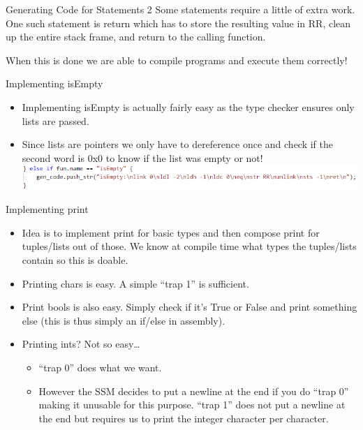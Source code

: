 \documentclass[10pt]{beamer}
\begin{document}
\begin{frame}{Generating Code for Statements 2}
Some statements require a little of extra work. One such statement is return which has to store the resulting value in RR, clean up the entire stack frame, and return to the calling function.

When this is done we are able to compile programs and execute them correctly!
\end{frame}

\begin{frame}{Implementing isEmpty}
    \begin{itemize}
        \item Implementing isEmpty is actually fairly easy as the type checker ensures only lists are passed.
        \item Since lists are pointers we only have to dereference once and check if the second word is 0x0 to know if the list was empty or not!
        \includegraphics[width=\textwidth]{presentation3/6.png}
    \end{itemize}
\end{frame}

\begin{frame}{Implementing print}
    \begin{itemize}
        \item Idea is to implement print for basic types and then compose print for tuples/lists out of those. We know at compile time what types the tuples/lists contain so this is doable.
        \item Printing chars is easy. A simple ``trap 1'' is sufficient.
        \item Print bools is also easy. Simply check if it's True or False and print something else (this is thus simply an if/else in assembly).
        \item Printing ints? Not so easy\dots
        \begin{itemize}
            \item ``trap 0'' does what we want.
            \item However the SSM decides to put a newline at the end if you do ``trap 0'' making it unusable for this purpose. ``trap 1'' does not put a newline at the end but requires us to print the integer character per character.
        \end{itemize}
    \end{itemize}
\end{frame}
\end{document}
